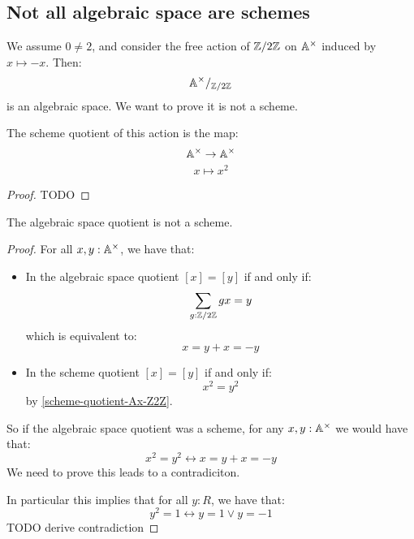 \subsection{Not all algebraic space are schemes}

We assume $0\not=2$, and consider the free action of $\mathbb{Z}/2\mathbb{Z}$ on $\mathbb{A}^\times$ induced by $x\mapsto -x$. Then:
\[\mathbb{A}^\times /_{\mathbb{Z}/2\mathbb{Z}} \]
is an algebraic space. We want to prove it is not a scheme.

\begin{lemma}
The scheme quotient of this action is the map:
\[\mathbb{A}^\times \to \mathbb{A}^\times\]
\[x\mapsto x^2\]
\end{lemma}

\begin{proof}
TODO
\end{proof}

\begin{proposition}
The algebraic space quotient is not a scheme.
\end{proposition}

\begin{proof}
For all $x,y:\mathbb{A}^\times$, we have that:
\begin{itemize}
\item In the algebraic space quotient $[x]=[y]$ if and only if:
\[\sum_{g: \mathbb{Z}/2\mathbb{Z}} gx = y\]
which is equivalent to:
\[x=y + x=-y\]
\item In the scheme quotient $[x]=[y]$ if and only if:
\[x^2 = y^2\]
by \cref{scheme-quotient-Ax-Z2Z}.
\end{itemize}
So if the algebraic space quotient was a scheme, for any $x,y:\mathbb{A}^\times$ we would have that:
\[x^2=y^2 \leftrightarrow x=y + x=-y\]
We need to prove this leads to a contradiciton. 

In particular this implies that for all $y:R$, we have that:
\[y^2=1 \leftrightarrow y=1\lor y=-1\]
TODO derive contradiction

\end{proof}






